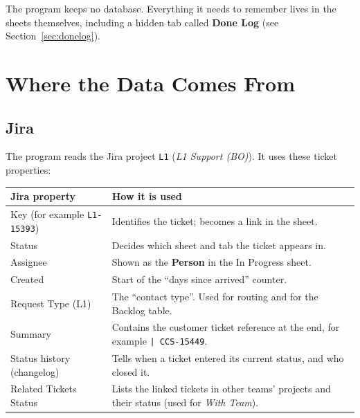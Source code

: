 \documentclass[11pt,a4paper]{article}
\newcommand{\code}[1]{\texttt{#1}}
\newcommand{\tab}[1]{\textbf{#1}}
\let\oldsection\section
\renewcommand{\section}{\needspace{12\baselineskip}\oldsection}
\let\oldsubsection\subsection
\renewcommand{\subsection}{\needspace{7\baselineskip}\oldsubsection}
\begin{document}
\begin{note}
The program keeps no database. Everything it needs to remember lives in the sheets themselves, including a hidden tab
called \tab{Done Log} (see Section~\ref{sec:donelog}).
\end{note}

\section{Where the Data Comes From}

\subsection{Jira}
The program reads the Jira project \code{L1} (\emph{L1 Support (BO)}). It uses these ticket properties:

\begin{tabularx}{\linewidth}{@{}l L@{}}
\toprule
\textbf{Jira property} & \textbf{How it is used} \\
\midrule
Key (for example \code{L1-15393}) & Identifies the ticket; becomes a link in the sheet. \\
Status & Decides which sheet and tab the ticket appears in. \\
Assignee & Shown as the \tab{Person} in the In Progress sheet. \\
Created & Start of the ``days since arrived'' counter. \\
Request Type (L1) & The ``contact type''. Used for routing and for the Backlog table. \\
Summary & Contains the customer ticket reference at the end, for example \code{| CCS-15449}. \\
Status history (changelog) & Tells when a ticket entered its current status, and who closed it. \\
Related Tickets Status & Lists the linked tickets in other teams' projects and their status (used for \emph{With Team}). \\
\bottomrule
\end{tabularx}
\end{document}

